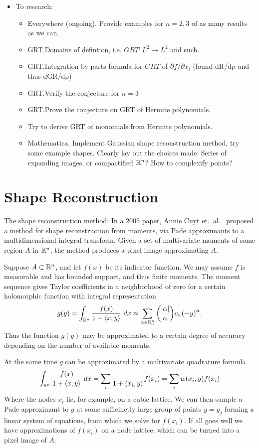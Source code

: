 \begin{itemize}
    \item To research:
    \begin{itemize}
        \item Everywhere (ongoing). Provide examples for $n = 2, 3$ of as many results as we can.
        \item GRT.\@ Domains of defintion, i.e. $GRT: L^2 \rightarrow L^2$ and such.
        \item GRT.\@ Integration by parts formula for $GRT$ of $\partial f/\partial x_i$ (found dR/dp and thus dGR/dp)
        \item GRT.\@ Verify the conjecture for $n=3$
        \item GRT.\@ Prove the conjecture on GRT of Hermite polynomials.
        \item Try to derive GRT of monomials from Hermite polynomials.
        \item Mathematica. Implement Gaussian shape reconstruction method, try some example shapes. Clearly lay out the choices made: Series of expanding images, or compactified $\mathbb{R}^n$? How to complexify points?
    \end{itemize}
\end{itemize}

\section{Shape Reconstruction}
The shape reconstruction method: In a 2005 paper, Annie Cuyt et.\ al.\ \cite{Cuyt05} proposed a method for shape reconstruction from moments, via Pade approximants to a multidimensional integral transform. Given a set of multivariate moments of some region $A$ in $\mathbb{R}^n$, the method produces a pixel image approximating $A$. 

Suppose $A \subset \mathbb{R}^n$, and let $f(x)$ be its indicator function. We may assume $f$ is measurable and has bounded support, and thus finite moments. The moment sequence gives Taylor coefficients in a neighborhood of zero for a certain holomorphic function with integral representation
\begin{align*}
    g(y) = \int_{\mathbb{R}^n} \frac{f(x)}{1 + \langle x, y\rangle} ~dx \approx \sum_{\alpha \in \mathbb{N}_0^n} \binom{|\alpha|}{\alpha} c_\alpha {(-y)}^\alpha.
\end{align*}
Thus the function $g(y)$ may be approximated to a certain degree of accuracy depending on the number of available moments.

At the same time $g$ can be approximated by a multivariate quadrature formula
\[
    \int_{\mathbb{R}^n} \frac{f(x)}{1 + \langle x, y\rangle} ~dx
    = \sum_{i} \frac1{1+\langle x_i, y\rangle} f(x_i)
    = \sum_{i} w(x_i, y) f(x_i)
\]
Where the nodes $x_i$ lie, for example, on a cubic lattice. We can then sample a Pade approximant to $g$ at some sufficinetly large group of points $y = y_j$ forming a linear system of equations, from which we solve for $f(x_i)$. If all goes well we have approximations of $f(x_i)$ on a node lattice, which can be turned into a pixel image of $A$.

